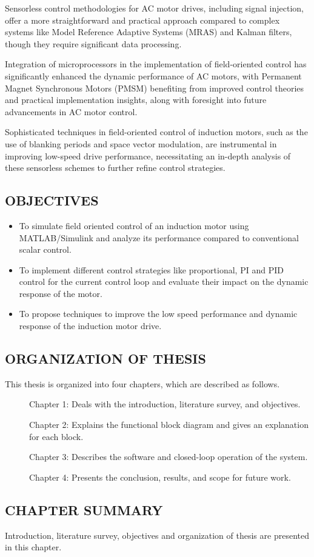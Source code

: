Sensorless control methodologies for AC motor drives, including signal injection, offer a more straightforward and practical approach compared to complex systems like Model Reference Adaptive Systems (MRAS) and Kalman filters, though they require significant data processing.


Integration of microprocessors in the implementation of field-oriented control has significantly enhanced the dynamic performance of AC motors, with Permanent Magnet Synchronous Motors (PMSM) benefiting from improved control theories and practical implementation insights, along with foresight into future advancements in AC motor control.


Sophisticated techniques in field-oriented control of induction motors, such as the use of blanking periods and space vector modulation, are instrumental in improving low-speed drive performance, necessitating an in-depth analysis of these sensorless schemes to further refine control strategies.

\subsection{OBJECTIVES}
\begin{itemize}
	\item To simulate field oriented control of an induction motor using MATLAB/Simulink and analyze its performance compared to conventional scalar control.
	\item To implement different control strategies like proportional, PI and PID control for the current control loop and evaluate their impact on the dynamic response of the motor.

	\item To propose techniques to improve the low speed performance and dynamic response of the induction motor drive.
\end{itemize}

\subsection{ORGANIZATION OF THESIS}
\hspace{0.2in}This thesis is organized into four chapters, which are described as follows.

\begin{description}
	\item[] Chapter 1: Deals with the introduction, literature survey, and objectives.
	\item[] Chapter 2: Explains the functional block diagram and gives an explanation for each block.
	\item[] Chapter 3: Describes the software and closed-loop operation of the system.
	\item[] Chapter 4: Presents the conclusion, results, and scope for future work.
\end{description}

\subsection{CHAPTER SUMMARY}
\hspace{0.2in} Introduction, literature survey, objectives and organization of thesis are presented in this chapter.

\newpage